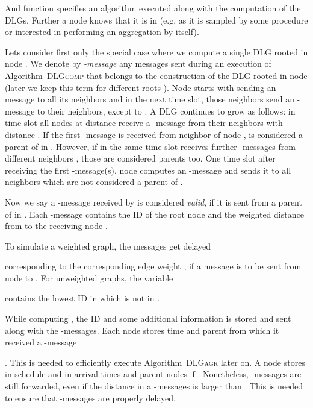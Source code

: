 \documentclass[11pt]{article}
\newcommand{\todoI}[1]{}\newcommand{\blueI}[1]{}
\newif\iffull
\begin{document}
And function  specifies an algorithm executed along with the computation of the  DLGs.
Further a node  knows that it is in  (e.g. as it is sampled by some procedure or interested in performing an aggregation by itself).
\todoI{describe basic short idea of Algo}
Lets consider first only the special case where we compute a single DLG  rooted in node . We denote by \emph{-message} any messages sent during an execution of Algorithm\iffull~\ref{alg:DLGcomp}\fi~\textsc{DLGcomp} that belongs to the construction of the DLG rooted in node  (later we keep this term for different roots ).  Node  starts with sending an -message to all its neighbors  and in the next time slot, those neighbors  send an -message to their neighbors, except to .
A DLG  continues to grow as follows: in time slot  all nodes  at distance  receive a -message from their neighbors  with distance . If the first -message is received from neighbor  of node ,  is considered a parent of  in . However, if in the same time slot  receives further -messages from different neighbors , those are considered parents too. One time slot after receiving the first -message(s), node  computes an -message and sends it to all neighbors  which are not considered a parent of .


Now we say a -message received by  is considered \emph{valid}, if it is sent from a parent of  in . Each -message contains the ID of the root node  and the weighted distance  from  to the receiving node .




To simulate a weighted graph, the messages get delayed 
\iffull in Line \ref{line:li} \fi
 corresponding to the corresponding edge weight , if a message is to be sent from node  to . For unweighted graphs, the variable 
\iffull (Line \ref{line:li}) \fi
 contains the lowest ID in  which is not in .\todoI{details: what is , .}

While computing , the ID  and some additional information is stored and sent along with the -messages. Each node stores time  and parent  from which it received a -message
\iffull
 (Line \ref{line:tau} and \ref{line:tauplusone})
\fi
. This is needed to efficiently execute Algorithm\iffull~\ref{alg:DLGagr}\fi~\textsc{DLGagr} later on. 
A node  stores in schedule  and in  arrival times and parent nodes  if  \iffull(Lines \ref{line:kvarstart} to \ref{line:exf} are only executed if , i.e. if , where  was received in a -message)\fi.
Nonetheless, -messages are still forwarded, even if the distance  in a -messages is larger than .
This is needed to ensure that -messages are properly delayed.
\end{document}
